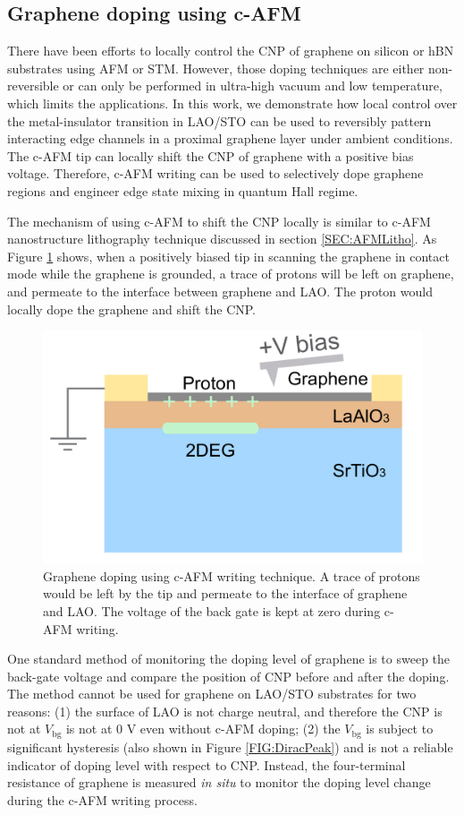 \documentclass[pdflatex, sectionletters, 12pt]{pittetd}    %
\begin{document}
\subsection{Graphene doping using c-AFM}

There have been efforts to locally control the CNP of graphene on silicon or hBN substrates using AFM\cite{schmidt2013mixing} or STM\cite{velasco2016nanoscale}. However, those doping techniques are either non-reversible or can only be performed in ultra-high vacuum and low temperature, which limits the applications. In this work, we demonstrate how local control over the metal-insulator transition in LAO/STO can be used to reversibly pattern interacting edge channels in a proximal graphene layer under ambient conditions. The c-AFM tip can locally shift the CNP of graphene with a positive bias voltage. Therefore, c-AFM writing can be used to selectively dope graphene regions and engineer edge state mixing in quantum Hall regime.

The mechanism of using c-AFM to shift the CNP locally is similar to c-AFM nanostructure lithography technique discussed in section \ref{SEC:AFMLitho}. As Figure \ref{FIG:GrapheneAFM} shows, when a positively biased tip in scanning the graphene in contact mode while the graphene is grounded, a trace of protons will be left on graphene, and permeate\cite{hu2014proton} to the interface between graphene and LAO. The proton would locally dope the graphene and shift the CNP. 
\\

\begin{figure}[h!]
	\centering
	\includegraphics[width=.45\textwidth]{Drawing/GrapheneAFM.pdf}
	\caption{Graphene doping using c-AFM writing technique. A trace of protons would be left by the tip and permeate to the interface of graphene and LAO. The voltage of the back gate is kept at zero during c-AFM writing.}
	\label{FIG:GrapheneAFM}
\end{figure}

One standard method of monitoring the doping level of graphene is to sweep the back-gate voltage and compare the position of CNP before and after the doping. The method cannot be used for graphene on LAO/STO substrates for two reasons: (1) the surface of LAO is not charge neutral, and therefore the CNP is not at $V_\mathrm{bg}$ is not at 0 V even without c-AFM doping; (2) the $V_\mathrm{bg}$ is subject to significant hysteresis\cite{couto2011transport, jnawali2017room} (also shown in Figure \ref{FIG:DiracPeak}) and is not a reliable indicator of doping level with respect to CNP. Instead, the four-terminal resistance of graphene is measured \emph{in situ} to monitor the doping level change during the c-AFM writing process. 
\end{document}
